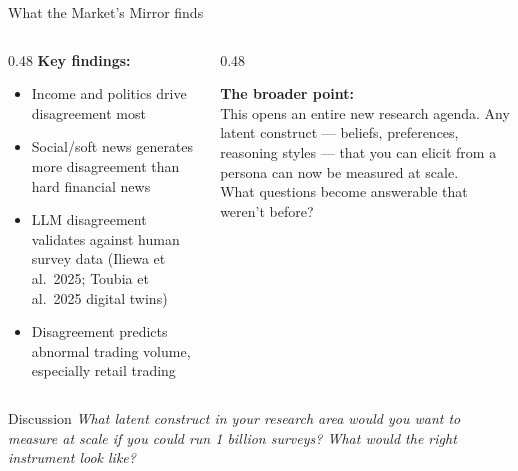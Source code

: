 \documentclass[aspectratio=169, 10pt]{beamer}
\newcommand{\discussprompt}[1]{%
  \begin{alertblock}{\faComments\quad Discussion}
    \textit{#1}
  \end{alertblock}
}
\begin{document}
\begin{frame}{What the Market's Mirror finds}
  \begin{columns}[T]
    \begin{column}{0.48\textwidth}
      \textbf{Key findings:}
      \begin{itemize}
        \small
        \item Income and politics drive disagreement most
        \item Social/soft news generates more disagreement than hard
              financial news
        \item LLM disagreement validates against human survey data
              (Iliewa et al.\ 2025; Toubia et al.\ 2025 digital twins)
        \item Disagreement predicts abnormal trading volume,
              especially retail trading
      \end{itemize}
    \end{column}
    \begin{column}{0.48\textwidth}
      \begin{findingbox}
        \textbf{The broader point:}\\[0.3em]
        \small This opens an entire new research agenda.
        Any latent construct --- beliefs, preferences, reasoning styles ---
        that you can elicit from a persona can now be measured at scale.\\[0.3em]
        What questions become answerable that weren't before?
      \end{findingbox}
    \end{column}
  \end{columns}

  \vspace{0.3em}
  \discussprompt{What latent construct in your research area would you want to
  measure at scale if you could run 1 billion surveys?
  What would the right instrument look like?}
\end{frame}
\end{document}
